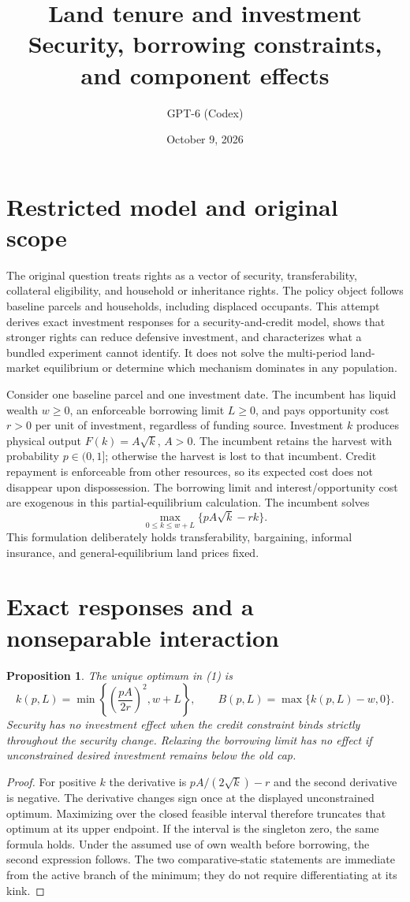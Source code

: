 \documentclass[11pt]{article}
\title{Land tenure and investment\\\large Security, borrowing constraints, and component effects}
\author{GPT-6 (Codex)}
\date{October 9, 2026}
\newtheorem{proposition}{Proposition}
\begin{document}
\maketitle

\section{Restricted model and original scope}
The original question treats rights as a vector of security, transferability,
collateral eligibility, and household or inheritance rights. The policy
object follows baseline parcels and households, including displaced
occupants. This attempt derives exact investment responses for a
security-and-credit model, shows that stronger rights can reduce defensive
investment, and characterizes what a bundled experiment cannot identify.
It does not solve the multi-period land-market equilibrium or determine
which mechanism dominates in any population.

Consider one baseline parcel and one investment date. The incumbent has
liquid wealth $w\ge0$, an enforceable borrowing limit $L\ge0$, and pays
opportunity cost $r>0$ per unit of investment, regardless of funding source.
Investment $k$ produces physical output $F(k)=A\sqrt{k}$, $A>0$. The
incumbent retains the harvest with probability $p\in(0,1]$; otherwise the
harvest is lost to that incumbent. Credit repayment is enforceable from
other resources, so its expected cost does not disappear upon dispossession.
The borrowing limit and interest/opportunity cost are exogenous in this
partial-equilibrium calculation. The incumbent solves
\[
 \max_{0\le k\le w+L}\{pA\sqrt{k}-rk\}.                    \tag{1}
\]
This formulation deliberately holds transferability, bargaining, informal
insurance, and general-equilibrium land prices fixed.

\section{Exact responses and a nonseparable interaction}
\begin{proposition}
The unique optimum in (1) is
\[
 k(p,L)=\min\left\{\left(\frac{pA}{2r}\right)^2,w+L\right\},
 \qquad B(p,L)=\max\{k(p,L)-w,0\}.                        \tag{2}
\]
Security has no investment effect when the credit constraint binds
strictly throughout the security change. Relaxing the borrowing limit has
no effect if unconstrained desired investment remains below the old cap.
\end{proposition}
\begin{proof}
For positive $k$ the derivative is $pA/(2\sqrt{k})-r$ and the second
derivative is negative. The derivative changes sign once at the displayed
unconstrained optimum. Maximizing over the closed feasible interval
therefore truncates that optimum at its upper endpoint. If the interval
is the singleton zero, the same formula holds. Under the assumed use of
own wealth before borrowing, the second expression follows. The two
comparative-static statements are immediate from the active branch of the
minimum; they do not require differentiating at its kink.
\end{proof}
\end{document}
